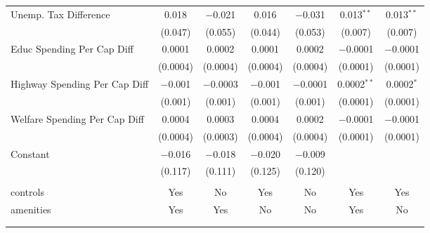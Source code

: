 \begin{table}[!htbp]
\begin{tabular}{@{\extracolsep{5pt}}lcccccc}
  Unemp. Tax Difference & 0.018 & $-$0.021 & 0.016 & $-$0.031 & 0.013$^{**}$ & 0.013$^{**}$ \\ 
  & (0.047) & (0.055) & (0.044) & (0.053) & (0.007) & (0.007) \\ 
  Educ Spending Per Cap Diff & 0.0001 & 0.0002 & 0.0001 & 0.0002 & $-$0.0001 & $-$0.0001 \\ 
  & (0.0004) & (0.0004) & (0.0004) & (0.0004) & (0.0001) & (0.0001) \\ 
  Highway Spending Per Cap Diff & $-$0.001 & $-$0.0003 & $-$0.001 & $-$0.0001 & 0.0002$^{**}$ & 0.0002$^{*}$ \\ 
  & (0.001) & (0.001) & (0.001) & (0.001) & (0.0001) & (0.0001) \\ 
  Welfare Spending Per Cap Diff & 0.0004 & 0.0003 & 0.0004 & 0.0002 & $-$0.0001 & $-$0.0001 \\ 
  & (0.0004) & (0.0003) & (0.0004) & (0.0004) & (0.0001) & (0.0001) \\ 
  Constant & $-$0.016 & $-$0.018 & $-$0.020 & $-$0.009 &  &  \\ 
  & (0.117) & (0.111) & (0.125) & (0.120) &  &  \\ 
 \hline \\[-1.8ex] 
controls & Yes & No & Yes & No & Yes & Yes \\ 
amenities & Yes & Yes & No & No & Yes & No \\ 
\hline \\[-1.8ex] 
\hline 
\hline \\[-1.8ex] 
\end{tabular} 
\end{table} 
